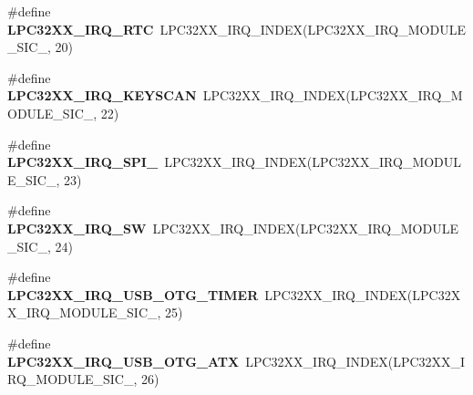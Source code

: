 \begin{DoxyCompactItemize}
\item 
\mbox{\label{group__lpc32xx__interrupt_ga455a17f489ab16700b4826c69287cdc6}} 
\#define {\bfseries L\+P\+C32\+X\+X\+\_\+\+I\+R\+Q\+\_\+\+R\+TC}~L\+P\+C32\+X\+X\+\_\+\+I\+R\+Q\+\_\+\+I\+N\+D\+EX(L\+P\+C32\+X\+X\+\_\+\+I\+R\+Q\+\_\+\+M\+O\+D\+U\+L\+E\+\_\+\+S\+I\+C\+\_, 20)
\item 
\mbox{\label{group__lpc32xx__interrupt_gafcbccdd0ec60c7a9e6e5ec0a32629994}} 
\#define {\bfseries L\+P\+C32\+X\+X\+\_\+\+I\+R\+Q\+\_\+\+K\+E\+Y\+S\+C\+AN}~L\+P\+C32\+X\+X\+\_\+\+I\+R\+Q\+\_\+\+I\+N\+D\+EX(L\+P\+C32\+X\+X\+\_\+\+I\+R\+Q\+\_\+\+M\+O\+D\+U\+L\+E\+\_\+\+S\+I\+C\+\_, 22)
\item 
\mbox{\label{group__lpc32xx__interrupt_ga03b59c103662a128e027971dbb776b4a}} 
\#define {\bfseries L\+P\+C32\+X\+X\+\_\+\+I\+R\+Q\+\_\+\+S\+P\+I\+\_}~L\+P\+C32\+X\+X\+\_\+\+I\+R\+Q\+\_\+\+I\+N\+D\+EX(L\+P\+C32\+X\+X\+\_\+\+I\+R\+Q\+\_\+\+M\+O\+D\+U\+L\+E\+\_\+\+S\+I\+C\+\_, 23)
\item 
\mbox{\label{group__lpc32xx__interrupt_gacfec54eb667a6bc7a80d049bd453971a}} 
\#define {\bfseries L\+P\+C32\+X\+X\+\_\+\+I\+R\+Q\+\_\+\+SW}~L\+P\+C32\+X\+X\+\_\+\+I\+R\+Q\+\_\+\+I\+N\+D\+EX(L\+P\+C32\+X\+X\+\_\+\+I\+R\+Q\+\_\+\+M\+O\+D\+U\+L\+E\+\_\+\+S\+I\+C\+\_, 24)
\item 
\mbox{\label{group__lpc32xx__interrupt_ga210ba5c4e4a0e85af655df7ed794563f}} 
\#define {\bfseries L\+P\+C32\+X\+X\+\_\+\+I\+R\+Q\+\_\+\+U\+S\+B\+\_\+\+O\+T\+G\+\_\+\+T\+I\+M\+ER}~L\+P\+C32\+X\+X\+\_\+\+I\+R\+Q\+\_\+\+I\+N\+D\+EX(L\+P\+C32\+X\+X\+\_\+\+I\+R\+Q\+\_\+\+M\+O\+D\+U\+L\+E\+\_\+\+S\+I\+C\+\_, 25)
\item 
\mbox{\label{group__lpc32xx__interrupt_gad258b502c82b887a2c47f0d9d8a826f4}} 
\#define {\bfseries L\+P\+C32\+X\+X\+\_\+\+I\+R\+Q\+\_\+\+U\+S\+B\+\_\+\+O\+T\+G\+\_\+\+A\+TX}~L\+P\+C32\+X\+X\+\_\+\+I\+R\+Q\+\_\+\+I\+N\+D\+EX(L\+P\+C32\+X\+X\+\_\+\+I\+R\+Q\+\_\+\+M\+O\+D\+U\+L\+E\+\_\+\+S\+I\+C\+\_, 26)
\item 
\mbox{\label{group__lpc32xx__interrupt_ga906a82cdd4617bd20d188c2462442e7d}} 

\end{DoxyCompactItemize}
